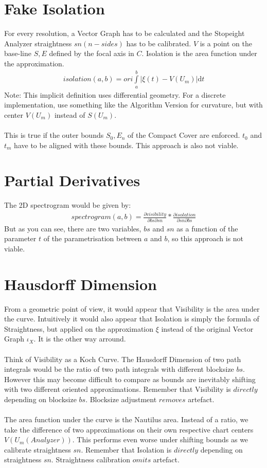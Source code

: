 \documentclass{report}
\begin{document}
\section{Fake Isolation}
For every resolution, a Vector Graph has to be calculated and the Stopeight Analyzer straightness $sn(n-sides)$ has to be calibrated. $V$ is a point on the base-line $S,E$ defined by the focal axis in $C$.
Isolation is the area function under the approximation.
\begin{align}
isolation(a,b)= ori \int \limits _{a}^{b} \vert \xi(t)-V(U_{m})\vert  \mathrm{d}t
\end{align}
Note: This implicit definition uses differential geometry. For a discrete implementation, use something like the Algorithm Version for curvature, but with center $V(U_{m})$ instead of $S(U_{m})$.\\\\
This is true if the outer bounds $S_{0},E_{n}$ of the Compact Cover are enforced. $t_{0}$ and $t_{m}$ have to be aligned with these bounds.
This approach is also not viable.

\section{Partial Derivatives}
The 2D spectrogram would be given by:
\begin{align}
spectrogram(a,b)=\frac{\partial visibility}{\partial bs \partial sn}*\frac{\partial isolation}{\partial sn \partial bs}
\end{align}
But as you can see, there are two variables, $bs$ and $sn$ as a function of the parameter $t$ of the parametrisation between $a$ and $b$, so this approach is not viable.

\section{Hausdorff Dimension}

From a geometric point of view, it would appear that Visibility is the area under the curve. Intuitively it would also appear that Isolation is simply the formula of Straightness, but applied on the approximation $\xi$ instead of the original Vector Graph $\iota_{X}$. It is the other way arround.\\\\
Think of Visibility as a Koch Curve. The Hausdorff Dimension of two path integrals would be the ratio of two path integrals with different blocksize $bs$. However this may become difficult to compare as bounds are inevitably shifting with two different oriented approximations. Remember that Visibility is $directly$ depending on blocksize $bs$. Blocksize adjustment $removes$ artefact.\\\\
The area function under the curve is the Nautilus area. Instead of a ratio, we take the difference of two approximations on their own respective chart centers $V(U_{m}(Analyzer))$. This performs even worse under shifting bounds as we calibrate straightness $sn$. Remember that Isolation is $directly$ depending on straightness $sn$. Straightness calibration $omits$ artefact.
\end{document}
